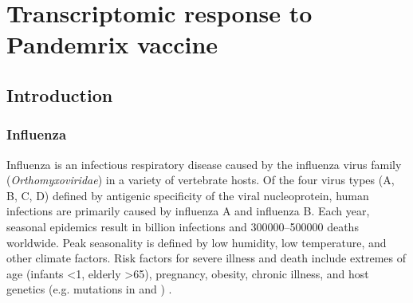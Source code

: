 %
%

\chapter{Transcriptomic response to Pandemrix vaccine}
\label{ch:hird_DGE}

\section{Introduction}


\subsection{Influenza}

Influenza is an infectious respiratory disease caused by the influenza virus family (\textit{Orthomyxoviridae}) in a variety of vertebrate hosts.
Of the four virus types (A, B, C, D) defined by antigenic specificity of the viral nucleoprotein,
human infections are primarily caused by influenza A and influenza B.
Each year, seasonal epidemics result in  billion infections and \numrange{300000}{500000} deaths worldwide.
Peak seasonality is defined by low humidity, low temperature, and other climate factors.
Risk factors for severe illness and death include extremes of age (infants \SI{<1}{\year}, elderly \SI{>65}{\year}), pregnancy, obesity, chronic illness, and host genetics (e.g. mutations in  and ) \autocite{krammer2018Influenza,dhakal2019HostFactorsImpact}.


